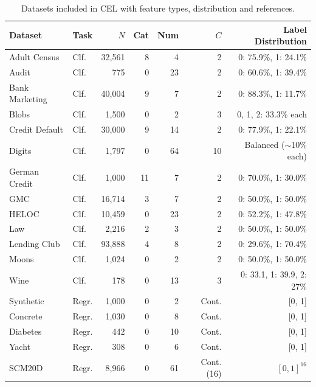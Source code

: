 \documentclass[runningheads]{llncs}
\begin{document}
\begin{table}[!ht]
\centering
\footnotesize 
\setlength{\tabcolsep}{2pt} 
\caption{Datasets included in CEL with feature types, distribution and references.}
\label{tab:datasets_complete}
\begin{tabular}{l l r r r r r}
\toprule
\textbf{Dataset} & \textbf{Task} & \textbf{$N$} & \textbf{Cat} & \textbf{Num} & \textbf{$C$} & \textbf{Label Distribution} \\
\midrule
Adult Census \cite{adult} & Clf. & 32,561 & 8 & 4 & 2 & 0: 75.9\%, 1: 24.1\% \\
Audit \cite{audit} & Clf. & 775 & 0 & 23 & 2 & 0: 60.6\%, 1: 39.4\% \\
Bank Marketing \cite{moro2014bank} & Clf. & 40,004 & 9 & 7 & 2 & 0: 88.3\%, 1: 11.7\% \\
Blobs & Clf. & 1,500 & 0 & 2 & 3 & 0, 1, 2: 33.3\% each \\
Credit Default \cite{credit_default_data} & Clf. & 30,000 & 9 & 14 & 2 & 0: 77.9\%, 1: 22.1\% \\
Digits \cite{digits} & Clf. & 1,797 & 0 & 64 & 10 & Balanced ($\sim$10\% each) \\
German Credit \cite{german_credit_data} & Clf. & 1,000 & 11 & 7 & 2 & 0: 70.0\%, 1: 30.0\% \\
GMC \cite{pawelczyk2020learning} & Clf. & 16,714 & 3 & 7 & 2 & 0: 50.0\%, 1: 50.0\% \\
HELOC \cite{heloc} & Clf. & 10,459 & 0 & 23 & 2 & 0: 52.2\%, 1: 47.8\% \\
Law \cite{law} & Clf. & 2,216 & 2 & 3 & 2 & 0: 50.0\%, 1: 50.0\% \\
Lending Club \cite{jagtiani2019roles} & Clf. & 93,888 & 4 & 8 & 2 & 0: 29.6\%, 1: 70.4\% \\
Moons & Clf. & 1,024 & 0 & 2 & 2 & 0: 50.0\%, 1: 50.0\% \\
Wine \cite{wine} & Clf. & 178 & 0 & 13 & 3 & 0: 33.1, 1: 39.9, 2: 27\% \\
\midrule
Synthetic & Regr. & 1,000 & 0 & 2 & Cont. & [0, 1] \\
Concrete \cite{concrete_compressive_strength_data} & Regr. & 1,030 & 0 & 8 & Cont. & [0, 1]\\
Diabetes \cite{diabetes_data} & Regr. & 442 & 0 & 10 & Cont. & [0, 1] \\
Yacht \cite{yacht_hydrodynamics_data} & Regr. & 308 & 0 & 6 & Cont. & [0, 1] \\
SCM20D \cite{scm20d_data} & Regr. & 8,966 & 0 & 61 & Cont. (16) & $[0, 1]^{16}$ \\
\bottomrule
\end{tabular}
\end{table}
\end{document}
